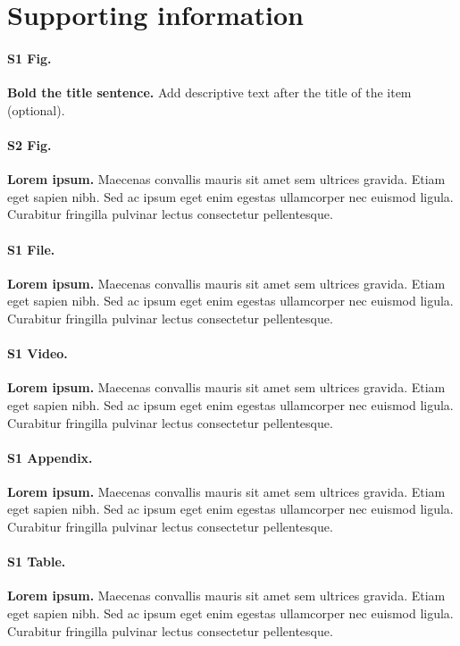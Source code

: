 \documentclass[10pt,letterpaper]{article}
\begin{document}
\section*{Supporting information}

\paragraph*{S1 Fig.}
\label{S1_Fig}
{\bf Bold the title sentence.} Add descriptive text after the title of the item (optional).

\paragraph*{S2 Fig.}
\label{S2_Fig}
{\bf Lorem ipsum.} Maecenas convallis mauris sit amet sem ultrices gravida. Etiam eget sapien nibh. Sed ac ipsum eget enim egestas ullamcorper nec euismod ligula. Curabitur fringilla pulvinar lectus consectetur pellentesque.

\paragraph*{S1 File.}
\label{S1_File}
{\bf Lorem ipsum.}  Maecenas convallis mauris sit amet sem ultrices gravida. Etiam eget sapien nibh. Sed ac ipsum eget enim egestas ullamcorper nec euismod ligula. Curabitur fringilla pulvinar lectus consectetur pellentesque.

\paragraph*{S1 Video.}
\label{S1_Video}
{\bf Lorem ipsum.}  Maecenas convallis mauris sit amet sem ultrices gravida. Etiam eget sapien nibh. Sed ac ipsum eget enim egestas ullamcorper nec euismod ligula. Curabitur fringilla pulvinar lectus consectetur pellentesque.

\paragraph*{S1 Appendix.}
\label{S1_Appendix}
{\bf Lorem ipsum.} Maecenas convallis mauris sit amet sem ultrices gravida. Etiam eget sapien nibh. Sed ac ipsum eget enim egestas ullamcorper nec euismod ligula. Curabitur fringilla pulvinar lectus consectetur pellentesque.

\paragraph*{S1 Table.}
\label{S1_Table}
{\bf Lorem ipsum.} Maecenas convallis mauris sit amet sem ultrices gravida. Etiam eget sapien nibh. Sed ac ipsum eget enim egestas ullamcorper nec euismod ligula. Curabitur fringilla pulvinar lectus consectetur pellentesque.
\end{document}
